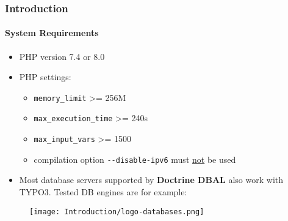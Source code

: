 
\begin{frame}[fragile]
	\frametitle{Introduction}
	\framesubtitle{System Requirements}

	\begin{itemize}
		\item PHP version 7.4 or 8.0
		\item PHP settings:

			\begin{itemize}
				\item \texttt{memory\_limit} >= 256M
				\item \texttt{max\_execution\_time} >= 240s
				\item \texttt{max\_input\_vars} >= 1500
				\item compilation option \texttt{-}\texttt{-disable-ipv6} must \underline{not} be used
			\end{itemize}

		\item Most database servers supported by \textbf{Doctrine DBAL} also work with TYPO3.
			Tested DB engines are for example:
	\end{itemize}

	\begin{figure}
		\texttt{[image: Introduction/logo-databases.png]}
	\end{figure}

\end{frame}

